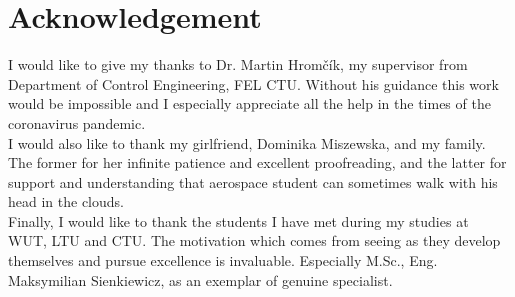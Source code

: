 \hspace{0pt}
\vfill
\section*{Acknowledgement}
I would like to give my thanks to Dr. Martin Hromčík, my supervisor from Department of Control Engineering, FEL CTU. Without his guidance this work would be impossible and I especially appreciate all the help in the times of the coronavirus pandemic.\\[0.1cm]

I would also like to thank my girlfriend, Dominika Miszewska, and my family. The former for her infinite patience and excellent proofreading, and the latter for support and understanding that aerospace student can sometimes walk with his head in the clouds.\\[0.1cm]

Finally, I would like to thank the students I have met during my studies at WUT, LTU and CTU. The motivation which comes from seeing as they develop themselves and pursue excellence is invaluable. Especially M.Sc., Eng. Maksymilian Sienkiewicz, as an exemplar of genuine specialist.